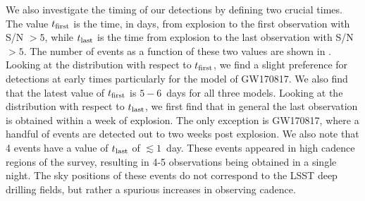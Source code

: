 We also investigate the timing of our detections by defining two crucial times. The value $t_{\rm first}$ is the time, in days, from explosion to the first observation with S/N $> 5$, while $t_{\rm last}$ is the time from explosion to the last observation with S/N $> 5$. The number of events as a function of these two values are shown in . Looking at the distribution with respect to $t_{\rm first}$, we find a slight preference for detections at early times particularly for the model of GW170817.  We also find that the latest value of $t_{\rm first}$ is \apx$5-6$~days for all three models. Looking at the distribution with respect to $t_{\rm last}$, we first find that in general the last observation is obtained within a week of explosion. The only exception is GW170817, where a handful of events are detected out to two weeks post explosion. We also note that 4 events have a value of $t_{\rm last}$ of $\lesssim 1$~day. These events appeared in high cadence regions of the survey, resulting in 4-5 observations being obtained in a single night. The sky positions of these events do not correspond to the LSST deep drilling fields, but rather a spurious increases in observing cadence.

